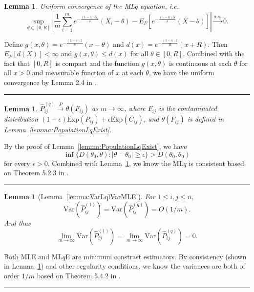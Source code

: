 \documentclass[a4paper]{article}
\newenvironment{proof}{{\bf Proof:  }}{\hfill\rule{2mm}{2mm}}
\newtheorem{lemma}[fact]{Lemma}
\renewcommand{\hat}{\widehat}
\begin{document}
\begin{lemma}
\label{lemma:UniformConvergence}
Uniform convergence of the MLq equation, i.e.
\[
	\sup_{\theta \in [0, R]} \left| \frac{1}{m} \sum_{i=1}^m e^{-\frac{(1-q) X_i}{\theta}}(X_i - \theta) - E_F[e^{-\frac{(1-q) X}{\theta}}(X - \theta)] \right| \stackrel{a.s.}{\to} 0.
\]
\end{lemma}
\begin{proof}
Define $g(x,\theta) = e^{-\frac{(1-q) x}{\theta}}(x - \theta)$ and $d(x) = e^{-\frac{(1-q)x}{R}}(x + R)$. Then $E_F[d(X)] < \infty$ and $g(x,\theta) \le d(x)$ for all $\theta \in [0, R]$.
Combined with the fact that $[0, R]$ is compact and the function $g(x,\theta)$ is continuous at each $\theta$ for all $x > 0$ and measurable function of $x$ at each $\theta$, we have the uniform convergence by Lemma 2.4 in \citep{newey1994large}.
\end{proof}

\begin{lemma}
\label{lemma:ELqConverge}
$\hat{P}_{ij}^{(q)} \stackrel{P}{\to} \theta(F_{ij})$ as $m \to \infty$, where $F_{ij}$ is the contaminated distribution $(1-\epsilon) \mathrm{Exp}(P_{ij}) + \epsilon \mathrm{Exp}(C_{ij})$, and $ \theta(F_{ij})$ is defined in Lemma~\ref{lemma:PopulationLqExist}. 
\end{lemma}
\begin{proof}
By the proof of Lemma~\ref{lemma:PopulationLqExist}, we have
\[
	\inf\{D(\theta_0, \theta): |\theta - \theta_0| \ge \epsilon \} > D(\theta_0, \theta_0)
\]
for every $\epsilon > 0$. Combined with Lemma~\ref{lemma:UniformConvergence}, we know the ML$q$ is consistent based on Theorem 5.2.3 in \citep{bickel2001mathematical}.
\end{proof}

\begin{lemma}[Lemma~\ref{lemma:VarLqlVarMLE}]
\label{lemma:VarLqlVarMLEproof}
For $1 \le i, j \le n$, 
\[
	\mathrm{Var}(\hat{P}^{(1)}_{ij})
    = \mathrm{Var}(\hat{P}^{(q)}_{ij}) = O(1/m).
\]
And thus
\[
	\lim_{m \to \infty} \mathrm{Var}(\hat{P}^{(1)}_{ij})
    = \lim_{m \to \infty} \mathrm{Var}(\hat{P}^{(q)}_{ij}) = 0.
\]
\end{lemma}
\begin{proof}
Both MLE and ML$q$E are minimum constrast estimators. By consistency (shown in Lemma~\ref{lemma:ELqConverge}) and other regularity conditions, we know the variances are both of order $1/m$ based on Theorem 5.4.2 in \citep{bickel2001mathematical}.
\end{proof}
\end{document}
